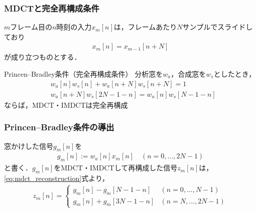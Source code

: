 \documentclass[14pt,xcolor=dvipsnames,table,dvipdfmx]{beamer}
\begin{document}
\begin{frame}[c]
    \frametitle{MDCTと完全再構成条件}
    $m$フレーム目の$n$時刻の入力$x_{m}[n]$は，フレームあたり$N$サンプルでスライドしており
    \begin{align}
        x_{m}[n] = x_{m - 1}[n + N]
    \end{align}
    が成り立つものとする．
    \begin{block}{Princen--Bradley条件（完全再構成条件）}
        分析窓を$w_{a}$，合成窓を$w_{s}$としたとき，
        \begin{align}
            & w_{a}[n] w_{s}[n] + w_{a}[n + N]w_{s}[n + N] = 1 \label{eq:princen_bradley_conditon_1} \\
            & w_{a}[n + N] w_{s}[2N - 1 - n] = w_{a}[n]w_{s}[N - 1 - n] \label{eq:princen_bradley_conditon_2}
        \end{align}
        ならば，MDCT・IMDCTは完全再構成
    \end{block}
\end{frame}

\begin{frame}[c]
    \frametitle{Princen--Bradley条件の導出}
    窓かけした信号$g_{m}[n]$を
    \begin{align}
        g_{m}[n] := w_{a}[n] x_{m}[n] \quad (n = 0, ..., 2N-1)
    \end{align}
    と書く．$g_{m}[n]$をMDCT・IMDCTして再構成した信号$z_{m}[n]$は，\eqref{eq:mdct_reconstruction}式より，
    \small
    \begin{align}
        z_{m}[n] = \left\{ \begin{array}{ll}
            g_{m}[n] - g_{m}[N - 1 - n] & (n = 0, ..., N - 1) \\
            g_{m}[n] + g_{m}[3N - 1 - n] & (n = N, ..., 2N - 1)
        \end{array} \right. \label{eq:windowed_mdct_reconstruction}
    \end{align}
\end{frame}
\end{document}
